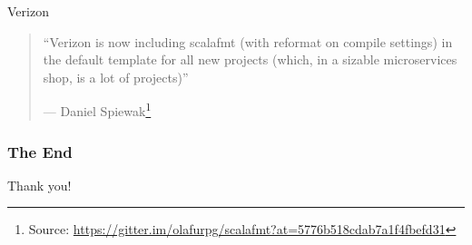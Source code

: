 \documentclass[xcolor=dvipsnames]{beamer}
\theoremstyle{definition}
\begin{document}
\begin{frame}{Verizon}
  \begin{quote}
    ``Verizon is now including scalafmt (with reformat on compile settings) in
    the default template for all new projects (which, in a sizable
    microservices shop, is a lot of projects)''

    \hfill --- Daniel Spiewak\footnote{Source: \url{https://gitter.im/olafurpg/scalafmt?at=5776b518cdab7a1f4fbefd31}}
  \end{quote}
\end{frame}


\begin{frame}[fragile]
  \frametitle{The End}
    \begin{center}
      \Huge
        Thank you!
    \end{center}
\end{frame}
\end{document}
